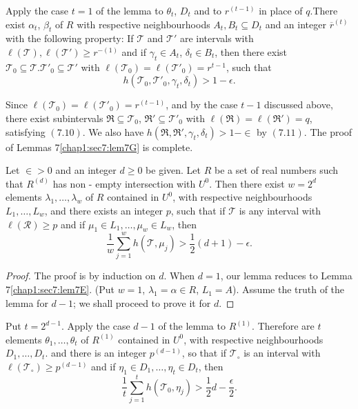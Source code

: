 Apply the case $t = 1$ of the lemma to $\theta_{t}$, $D_{t}$ and to $r^{(t-1)}$ in place of $q$.\pageoriginale There exist $\alpha_{t}$, $\beta_{t}$ of $R$ with respective neighbourhoods $A_{t}, B_{t} \subseteq D_{t}$ and an integer $\overline{r}^{(t)}$ with the following property: If $\mathscr{T}$ and $\mathscr{T}'$ are intervals with $\ell (\mathscr{T}), \ell (\mathscr{T}') \geq r^{-(1)}$ and if $\gamma_{t} \in A_{t}$, $\delta_{t} \in B_{t}$, then there exist $\mathscr{T}_{0} \subseteq \mathscr{T} . \mathscr{T}'_{0} \subseteq \mathscr{T}'$ with $\ell (\mathscr{T}_{0}) = \ell (\mathscr{T}'
_{0}) = r^{t-1}$, such that
\begin{equation*}
h(\mathscr{T}_{0}, \mathscr{T}'_{0}, \gamma_{t}, \delta_{t}) > 1 - \epsilon.\tag{7.11}\label{chap1:sec7:eq7.11}
\end{equation*}

Since $\ell (\mathscr{T}_{0}) = \ell(\mathscr{T}'_{0}) = r^{(t-1)}$, and by the case $t-1$ discussed above, there exist subintervals $\mathfrak{R} \subseteq \mathscr{T}_{0}$, $\mathfrak{R}' \subseteq \mathscr{T}'_{0}$ with $\ell (\mathfrak{R}) = \ell (\mathfrak{R}') = q$, satisfying $(7.10)$. We also have $h(\mathfrak{R}, \mathfrak{R}', \gamma_{t}, \delta_{t}) > 1 - \in$ by $(7.11)$. The proof of Lemmas 7\ref{chap1:sec7:lem7G} is complete.

\begin{lemma}\label{chap1:sec7:lem7H}
Let $\in > 0$ and an integer $d \geq 0$ be given. Let $R$ be a set of real numbers such that $R^{(d)}$ has non - empty intersection with $U^{0}$. Then there exist $w = 2^{d}$ elements $\lambda_{1}, \ldots, \lambda_{w}$ of $R$ contained in $U^{0}$, with respective neighbourhoods $L_{1}, \ldots, L_{w}$, and there exists an integer $p$, such that if $\mathscr{T}$ is any interval with $\ell (\mathscr{R}) \geq p$ and if $\mu_{1} \in L_{1}, \ldots, \mu_{w} \in L_{w}$, then
$$
\frac{1}{w} \sum_{j=1}^{w} h(\mathscr{T}, \mu_{j}) > \frac{1}{2} (d+1) - \epsilon.
$$
\end{lemma}

\begin{proof}
The proof is by induction on $d$. When $d = 1$, our lemma reduces to Lemma 7\ref{chap1:sec7:lem7E}. (Put $w = 1$, $\lambda_{1} = \alpha \in R$, $L_{1} = A$). Assume the truth of the lemma for $d-1$; we shall proceed to prove it for $d$. 
\end{proof}

Put $t = 2^{d-1}$. Apply the case $d-1$ of the lemma to $R^{(1)}$. Therefore are $t$ elements $\theta_{1}, \ldots, \theta_{t}$ of $R^{(1)}$ contained in $U^{0}$, with respective neighbourhoods $D_{1}, \ldots, D_{t}$. and there is an integer $p^{(d-1)}$, so that if $\mathscr{T}_{\circ}$ is an interval with $\ell (\mathscr{T}_{\circ}) \geq p^{(d-1)}$ and if $\eta_{1} \in D_{1}, \ldots, \eta_{t} \in D_{t}$, then
\begin{equation*}
\frac{1}{t} \sum_{j=1}^{t} h(\mathscr{T}_{0}, \eta_{j}) > \frac{1}{2} d - \frac{\epsilon}{2}.\tag{7.12}\label{chap1:sec7:eq7.12}
\end{equation*}

